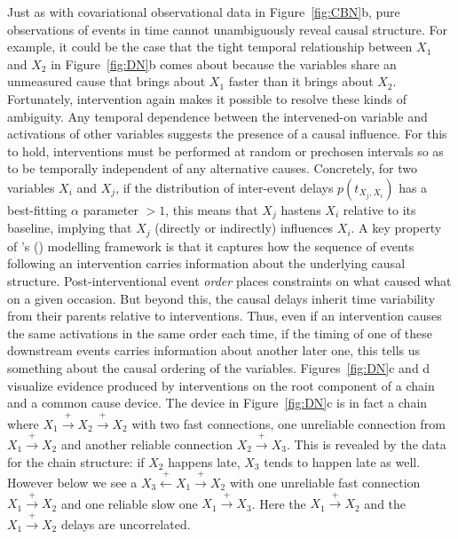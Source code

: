\documentclass{cambridge7A}%
\def\citeapos#1{\citeauthor{#1}'s (\citeyear{#1})}
\begin{document}
Just as with covariational observational data in Figure~\ref{fig:CBN}b, pure observations of events in time cannot unambiguously reveal causal structure.  For example, it could be the case that the tight temporal relationship between $X_1$ and $X_2$ in Figure~\ref{fig:DN}b comes about because the variables share an unmeasured cause that brings about $X_1$ faster than it brings about $X_2$.  Fortunately, intervention again makes it possible to resolve these kinds of ambiguity.  Any temporal dependence between the intervened-on variable and activations of other variables suggests the presence of a causal influence.  For this to hold, interventions must be performed at random or prechosen intervals so as to be temporally independent of any alternative causes.  Concretely, for two variables $X_i$ and $X_j$, if the distribution of inter-event delays $p(t_{X_j, X_i})$ has a best-fitting $\alpha$ parameter $>1$, this means that $X_j$ hastens $X_i$ relative to its baseline, implying that $X_j$ (directly or indirectly) influences $X_i$.  
A key property of \citeapos{bramley2018time} modelling framework is that it captures how the sequence of events following an intervention carries information about the underlying causal structure. Post-interventional event \emph{order} places constraints on what caused what on a given occasion.  But beyond this, the causal delays inherit time variability from their parents relative to interventions.  Thus, even if an intervention causes the same activations in the same order each time, if the timing of one of these downstream events carries information about another later one, this tells us something about the causal ordering of the variables.  Figures~\ref{fig:DN}c and d visualize evidence produced by interventions on the root component of a chain and a common cause device.   The device in Figure~\ref{fig:DN}c is in fact a chain where $X_1\!\stackrel{+}\rightarrow\!X_2\!\stackrel{+}\rightarrow\!X_2$ with two fast connections, one unreliable connection from $X_1\!\stackrel{+}\rightarrow\!X_2$ and another reliable connection $X_2\!\stackrel{+}\rightarrow\!X_3$.  This is revealed by the data for the chain structure: if $X_2$ happens late, $X_3$ tends to happen late as well.  However below we see a $X_3\!\stackrel{+}\leftarrow\!X_1\!\stackrel{+}\rightarrow\!X_2$ with one unreliable fast connection $X_1\!\stackrel{+}\rightarrow\!X_2$ and one reliable slow one $X_1\!\stackrel{+}\rightarrow\!X_3$.  Here the $X_1\!\stackrel{+}\rightarrow\!X_2$ and the $X_1\!\stackrel{+}\rightarrow\!X_2$ delays are uncorrelated.  
\end{document}
